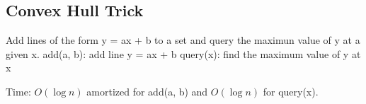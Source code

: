  \subsection{Convex Hull Trick}

Add lines of the form y = ax + b to a set and query the maximun value of y at a given x.
add(a, b): add line y = ax + b
query(x): find the maximum value of y at x

Time: $O(\log n)$ amortized for add(a, b) and $O(\log n)$ for query(x).

